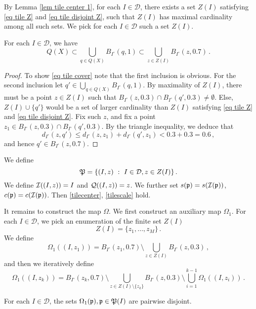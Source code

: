 By Lemma \ref{lem tile center 1}, for each $I \in \mathcal{D}$, there exists a set $Z(I)$ satisfying \eqref{eq tile Z} and \eqref{eq tile disjoint Z}, such that $Z(I)$ has maximal cardinality among all such sets. We pick for each $I \in \mathcal{D}$ such a set $Z(I)$.

\begin{lemma}
    For each $I \in \mathcal{D}$, we have
    \begin{equation}
        \label{eq tile cover}
        Q(X) \subset  \bigcup_{q \in Q(X)} B_{I^\circ}(q, 1) \subset \bigcup_{z \in Z(I)} B_{I^\circ}(z, 0.7)\,.
    \end{equation}
\end{lemma}

\begin{proof}
    To show \eqref{eq tile cover} note that the first inclusion is obvious. For the second inclusion let $q' \in  \bigcup_{q \in Q(X)} B_{I^\circ}(q, 1)$. By maximality of $Z(I)$, there must be a point $z \in Z(I)$ such that $B_{I^\circ}(z, 0.3) \cap B_{I^\circ}(q', 0.3) \ne \emptyset$. Else, $Z(I) \cup \{q'\}$ would be a set of larger cardinality than $Z(I)$ satisfying \eqref{eq tile Z} and \eqref{eq tile disjoint Z}. Fix such $z$, and fix a point $z_1 \in B_{I^\circ}(z, 0.3) \cap B_{I^\circ}(q', 0.3)$. By the triangle inequality, we deduce that
    $$
        d_{I^\circ}(z,q') \le d_{I^\circ}(z,z_1) + d_{I^\circ}(q', z_1) < 0.3 + 0.3 = 0.6\,,
    $$
    and hence $q' \in B_{I^\circ}(z, 0.7)$.
\end{proof}

We define
$$
    \fP = \{(I, z) \ : \ I \in \mathcal{D}, z \in Z(I)\}\,.
$$
We define $\sc((I, z)) = I$ and $\fcc((I, z)) = z$. We further set $s(\fp) = s(\sc(\fp))$, $c(\fp) = c(\sc(\fp))$. Then \eqref{tilecenter}, \eqref{tilescale} hold.

It remains to construct the map $\Omega$. We first construct an auxiliary map $\Omega_1$. For each $I \in \mathcal{D}$, we pick an enumeration of the finite set $Z(I)$
$$
    Z(I) = \{z_1, \dotsc, z_M\}\,.
$$
We define
$$
    \Omega_1((I, z_1)) = B_{I^\circ}(z_1, 0.7) \setminus \bigcup_{z \in Z(I)} B_{I^\circ}(z, 0.3)\,,
$$
and then we iteratively define
\begin{equation}
    \label{eq def omega1}
    \Omega_1((I, z_k)) = B_{I^\circ}(z_k, 0.7) \setminus \bigcup_{z \in Z(I) \setminus \{z_k\}} B_{I^\circ}(z, 0.3) \setminus \bigcup_{i=1}^{k-1} \Omega_1((I, z_i))\,.
\end{equation}

\begin{lemma}
    \label{lem omega1 disj}
    For each $I \in \mathcal{D}$, the sets $\Omega_1(\fp), \fp \in \fP(I)$ are pairwise disjoint.
\end{lemma}

